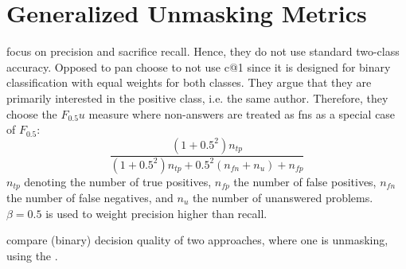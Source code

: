 \section{Generalized Unmasking Metrics}
\label{sec:generalized_unmasking_metrics}

\citet{bevendorff_generalizing_2019} focus on precision and sacrifice recall.
Hence, they do not use standard two-class accuracy.
Opposed to \ac{pan} \citet{bevendorff_generalizing_2019} choose to not use c@1 since it is designed for 
binary classification with equal weights for both classes.
They argue that they are primarily interested in the positive class, i.e. the same author.
Therefore, they choose the $F_0.5u$ measure where non-answers are treated as \acp{fn} as a special case of $F_0.5$:
$$\frac{(1+0.5^2)n_{tp}}{(1+0.5^2)n_{tp}+0.5^2(n_{fn}+n_{u})+n_{fp}}$$
$n_{tp}$ denoting the number of true positives, $n_{fp}$ the number of false positives, 
$n_{fn}$ the number of false negatives, and $n_{u}$ the number of unanswered problems.
$\beta=0.5$ is used to weight precision higher than recall.


\citet{bevendorff_bias_2019} compare (binary) decision quality of two approaches, where one is unmasking, 
using the .